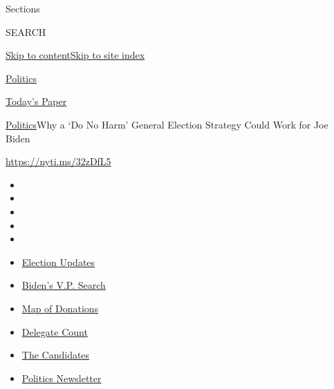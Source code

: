 Sections

SEARCH

\protect\hyperlink{site-content}{Skip to
content}\protect\hyperlink{site-index}{Skip to site index}

\href{https://www.nytimes.com/section/politics}{Politics}

\href{https://myaccount.nytimes.com/auth/login?response_type=cookie\&client_id=vi}{}

\href{https://www.nytimes.com/section/todayspaper}{Today's Paper}

\href{/section/politics}{Politics}\textbar{}Why a `Do No Harm' General
Election Strategy Could Work for Joe Biden

\url{https://nyti.ms/32zDfL5}

\begin{itemize}
\item
\item
\item
\item
\item
\end{itemize}

\begin{itemize}
\item
  \href{https://www.nytimes.com/2020/07/31/us/elections/biden-vs-trump.html?action=click\&pgtype=Article\&state=default\&region=TOP_BANNER\&context=storylines_menu}{Election
  Updates}
\item
  \href{https://www.nytimes.com/article/biden-vice-president-2020.html?action=click\&pgtype=Article\&state=default\&region=TOP_BANNER\&context=storylines_menu}{Biden's
  V.P. Search}
\item
  \href{https://www.nytimes.com/interactive/2020/07/24/us/politics/trump-biden-campaign-donors.html?action=click\&pgtype=Article\&state=default\&region=TOP_BANNER\&context=storylines_menu}{Map
  of Donations}
\item
  \href{https://www.nytimes.com/interactive/2020/us/elections/delegate-count-primary-results.html?action=click\&pgtype=Article\&state=default\&region=TOP_BANNER\&context=storylines_menu}{Delegate
  Count}
\item
  \href{https://www.nytimes.com/interactive/2019/us/politics/2020-presidential-candidates.html?action=click\&pgtype=Article\&state=default\&region=TOP_BANNER\&context=storylines_menu}{The
  Candidates}
\item
  \href{https://www.nytimes.com/newsletters/politics?action=click\&pgtype=Article\&state=default\&region=TOP_BANNER\&context=storylines_menu}{Politics
  Newsletter}
\end{itemize}

